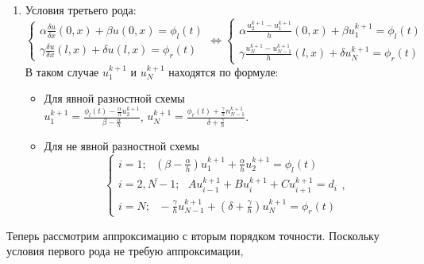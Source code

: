 \documentclass[12pt]{article}
\begin{document}
\begin{enumerate}
\begin{enumerate}
        \item Условия третьего рода:
            \begin{equation*}
                \begin{cases}
                    \alpha\frac{\delta u}{\delta x}(0,x) + \beta u(0,x)= \phi_l(t)
                    \\
                    \gamma\frac{\delta u}{\delta x}(l,x) + \delta u(l,x)= \phi_r(t)
                \end{cases}
                \Leftrightarrow
                \begin{cases}
                    \alpha\frac{u_{2}^{k+1}-u_{1}^{k+1}}{h}(0,x) + \beta u_{1}^{k+1} = \phi_l(t)
                    \\
                    \gamma\frac{u_{N}^{k+1}-u_{N-1}^{k+1}}{h}(l,x) + \delta u_{N}^{k+1}= \phi_r(t)
                \end{cases}
            \end{equation*}
            В таком случае $u_1^{k+1}$ и $u_N^{k+1}$ находятся по формуле:
            \begin{itemize}
                \item Для явной разностной схемы\\
                $u_1^{k+1}=\frac{\phi_l(t)-\frac{\alpha}{h}u_2^{k+1}}{\beta-\frac{\alpha}{h}}$, 
                $u_N^{k+1}=\frac{\phi_r(t)+\frac{\gamma}{h}n_{N-1}^{k+1}}{\delta+\frac{\gamma}{h}}$.
                \item Для не явной разностной схемы\\
                \begin{equation*}
                    \begin{cases}
                        i=1;\:\:\: \left(\beta-\frac{\alpha}{h}\right)u_1^{k+1} +\frac{\alpha}{h}u_{2}^{k+1}=\phi_l(t)
                        \\
                        i=\overline{2,N-1};\:\:\:Au_{i-1}^{k+1} + Bu_i^{k+1} +Cu_{i+1}^{k+1}=d_i
                        \\
                        i=N;\:\:\: -\frac{\gamma}{h}u_{N-1}^{k+1} + \left(\delta+\frac{\gamma}{h}\right)u_N^{k+1} =\phi_r(t)
                    \end{cases},
                \end{equation*}
            \end{itemize}
    \end{enumerate}
    Теперь рассмотрим аппроксимацию с вторым порядком точности. Поскольку условия первого рода не требую аппроксимации, 

\end{enumerate}
\end{document}
